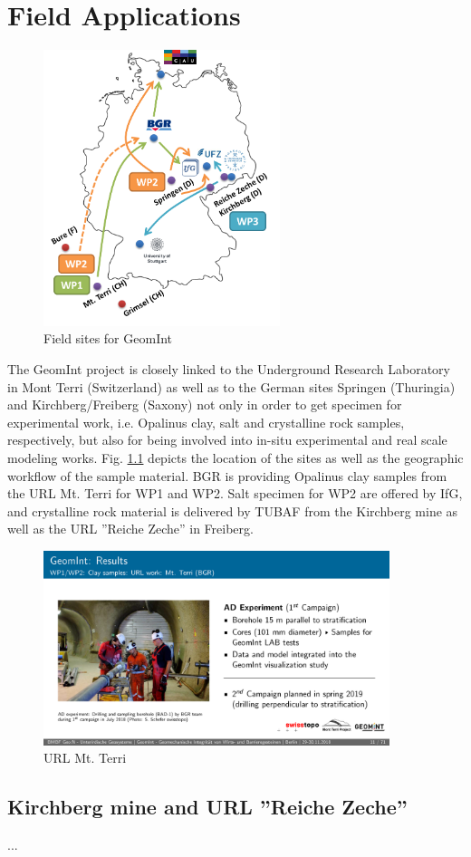 \chapter{Field Applications}


\begin{figure}
\includegraphics[width=6.9cm]{figures/geomint-exp.png}
\caption{Field sites for GeomInt}
\label{fig:geomint-sites}
\end{figure}
The GeomInt project is closely linked to the Underground Research Laboratory in Mont Terri (Switzerland) as well as to the German sites Springen (Thuringia) and Kirchberg/Freiberg (Saxony) not only in order to get specimen for experimental work, i.e. Opalinus clay, salt and crystalline rock samples, respectively, but also for being involved into in-situ experimental and real scale modeling works.
Fig. \ref{fig:geomint-sites} depicts the location of the sites as well as the geographic workflow of the sample material. BGR is providing Opalinus clay samples from the URL Mt. Terri for WP1 and WP2. Salt specimen for WP2 are offered by IfG, and crystalline rock material is delivered by TUBAF from the Kirchberg mine as well as the URL ''Reiche Zeche'' in Freiberg.

\begin{figure}
\includegraphics[width=0.9\textwidth]{figures/geomint-mt-terri.png}
\caption{URL Mt. Terri}
\label{fig:geomint-exp}
\end{figure}

\section{Kirchberg mine and URL ''Reiche Zeche''}

\begin{list}{-}{\leftmargin=1em \itemindent=0em \itemsep=0.2em}
\item ...
\end{list}
